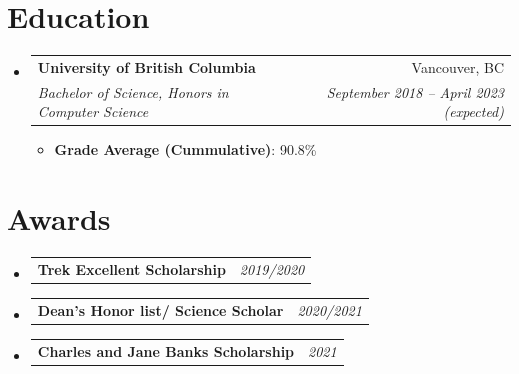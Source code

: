 \documentclass[letterpaper,11pt]{article}
\makeatletter
\newcommand{\resumeItem}[2]{
  \item{
    \textbf{#1}{: #2 \vspace{-2pt}}
  }
}
\newcommand{\resumeSubheading}[4]{
  \vspace{-1pt}\item
    \begin{tabular*}{0.97\textwidth}{@{}l@{\extracolsep{\fill}}r@{}}
      \textbf{#1} & #2 \\
      \textit{#3} & \textit{ #4} \\
    \end{tabular*}\vspace{-5pt}
}
\newcommand{\awardSubItem}[2]{
  \item
    \begin{tabular*}{0.97\textwidth}{@{}l@{\extracolsep{\fill}}r@{}}
      \textbf{ #1} & \textit{ #2} \\
    \end{tabular*}\vspace{-8pt}
}
\newcommand{\resumeSubItem}[2]{\resumeItem{#1}{#2}\vspace{-4pt}}
\newcommand{\resumeSubHeadingListStart}{\begin{itemize}[leftmargin=*]}
\newcommand{\resumeSubHeadingListEnd}{\end{itemize}}
\newcommand{\resumeItemListStart}{\begin{itemize}}
\newcommand{\resumeItemListEnd}{\end{itemize}\vspace{-5pt}}
\makeatother
\begin{document}
  


%



\section{Education}
  \resumeSubHeadingListStart
    \resumeSubheading
      {University of British Columbia}{Vancouver, BC}
      {Bachelor of Science, Honors in Computer Science}{September 2018 -- April 2023 (expected)}
      \resumeItemListStart
          \resumeItem{Grade Average (Cummulative)} {90.8\%}
      \resumeItemListEnd
  \resumeSubHeadingListEnd



\section{Awards}
  \resumeSubHeadingListStart
  \awardSubItem{Trek Excellent Scholarship}     {2019/2020}
  \awardSubItem{Dean's Honor list/ Science Scholar} {2020/2021}
  \awardSubItem{Charles and Jane Banks Scholarship}{2021}
  \resumeSubHeadingListEnd



\end{document}
